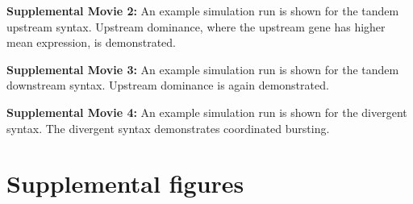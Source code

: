 \documentclass[11pt]{article} %
\begin{document}
{\small \noindent \textbf{Supplemental Movie 2:} An example simulation run is shown for the tandem upstream syntax. Upstream dominance, where the upstream gene has higher mean expression, is demonstrated.}

{\small \noindent \textbf{Supplemental Movie 3:} An example simulation run is shown for the tandem downstream syntax. Upstream dominance is again demonstrated.}

{\small \noindent \textbf{Supplemental Movie 4:} An example simulation run is shown for the divergent syntax. The divergent syntax demonstrates coordinated bursting.}

\FloatBarrier


\printbibliography

\clearpage
\appendix
\titleformat{\subsection}[hang]{\bfseries}{\thesubsection}{0em}{\;\;}
\renewcommand{\appendixpagename}{Supplemental information}
\renewcommand{\thefigure}{S\arabic{figure}}
\renewcommand{\theequation}{S\arabic{equation}}
\setcounter{equation}{0}
\setcounter{figure}{0}
\appendixpage

\section{Supplemental figures}
\FloatBarrier
\end{document}
